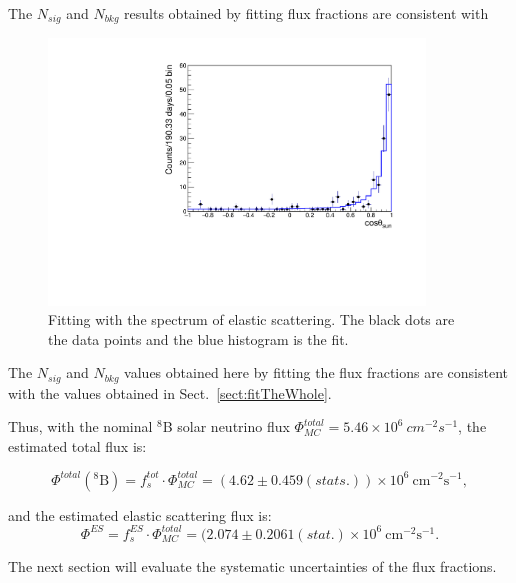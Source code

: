 The $N_{sig}$ and $N_{bkg}$ results obtained by fitting flux fractions are consistent with

\begin{figure}[!htb]
	\centering
	\includegraphics[width=10cm]{ESfluxFit.pdf}
	\caption[Fitting with the spectrum of elastic scattering.]{Fitting with the spectrum of elastic scattering. The black dots are the data points and the blue histogram is the fit.}
	\label{fig:ESfluxFit}
\end{figure}

The $N_{sig}$ and $N_{bkg}$ values obtained here by fitting the flux fractions are consistent with the values obtained in Sect.~\ref{sect:fitTheWhole}.

Thus, with the nominal $^8$B solar neutrino flux $\Phi^{total}_{MC}=5.46\times 10^6~cm^{-2}s^{-1}$, the estimated total flux is:

\begin{equation}
\Phi^{total}(\mathrm{^8 B})=f^{tot}_s\cdot \Phi^{total}_{MC}=(4.62 \pm 0.459(stats.))\times 10^6~\mathrm{cm^{-2}s^{-1}},
\end{equation}

and the estimated elastic scattering flux is:
\begin{equation}
\Phi^{ES}=f^{ES}_s\cdot \Phi^{total}_{MC}=( 2.074\pm 0.2061(stat.)\times 10^6~\mathrm{cm^{-2}s^{-1}}.
\end{equation}

The next section will evaluate the systematic uncertainties of the flux fractions.


